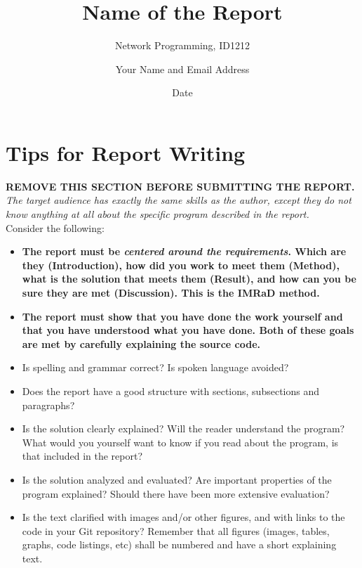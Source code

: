 \documentclass[a4paper]{scrartcl}
\title{Name of the Report}
\subtitle{Network Programming, ID1212}
\author{Your Name and Email Address}
\date{Date}
\begin{document}
\maketitle

\section*{Tips for Report Writing}
\textbf{REMOVE THIS SECTION BEFORE SUBMITTING THE REPORT.}\\

\noindent \textit{The target audience has exactly the same skills as the author, except they do not know anything at all about the specific program described in the report.} \\

Consider the following:

\begin{itemize}
  \item \textbf{The report must be \textit{centered around the requirements}. Which are they (Introduction), how did you work to meet them (Method), what is the solution that meets them (Result), and how can you be sure they are met (Discussion). This is the IMRaD method.}

  \item \textbf{The report must show that you have done the work yourself and that you have understood what you have done. Both of these goals are met by carefully explaining the source code.}

  \item Is spelling and grammar correct? Is spoken language avoided?

  \item Does the report have a good structure with sections, subsections and paragraphs?

  \item Is the solution clearly explained? Will the reader understand the program? What would you yourself want to know if you read about the program, is that included in the report?

  \item Is the solution analyzed and evaluated? Are important properties of the program explained? Should there have been more extensive evaluation?

  \item Is the text clarified with images and/or other figures, and with links to the code in your Git repository? Remember that all figures (images, tables, graphs, code listings, etc) shall be numbered and have a short explaining text.
\end{itemize}
\end{document}
